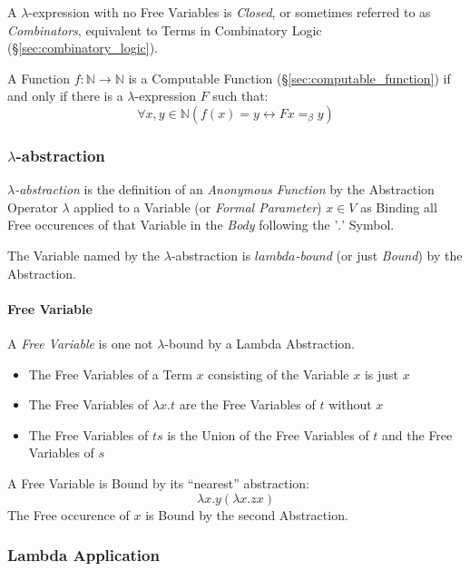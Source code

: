 A $\lambda$-expression with no Free Variables is \emph{Closed}, or
sometimes referred to as \emph{Combinators}, equivalent to Terms in
Combinatory Logic (\S\ref{sec:combinatory_logic}).

A Function $f : \mathbb{N} \rightarrow \mathbb{N}$ is a Computable
Function (\S\ref{sec:computable_function}) if and only if there is a
$\lambda$-expression $F$ such that:
\[
  \forall x,y \in \mathbb{N} (f(x)=y \leftrightarrow F x =_\beta y)
\]



\subsubsection{$\lambda$-abstraction}\label{sec:lambda_abstraction}

\emph{$\lambda$-abstraction} is the definition of an \emph{Anonymous
  Function} by the Abstraction Operator $\lambda$ applied to a
Variable (or \emph{Formal Parameter}) $x \in V$ as Binding all Free
occurences of that Variable in the \emph{Body} following the '$.$'
Symbol.

The Variable named by the $\lambda$-abstraction is
\emph{$lambda$-bound} (or just \emph{Bound}) by the Abstraction.



\paragraph{Free Variable}\label{sec:free_variable}\hfill

A \emph{Free Variable} is one not $\lambda$-bound by a Lambda
Abstraction.

\begin{itemize}
  \item The Free Variables of a Term $x$ consisting of the Variable
    $x$ is just $x$
  \item The Free Variables of $\lambda x.t$ are the Free Variables of
    $t$ without $x$
  \item The Free Variables of $ts$ is the Union of the Free Variables
    of $t$ and the Free Variables of $s$
\end{itemize}

A Free Variable is Bound by its ``nearest'' abstraction:
\[
  \lambda x.y (\lambda x.z x)
\]
The Free occurence of $x$ is Bound by the second Abstraction.



\subsubsection{Lambda Application}\label{sec:lambda_application}


